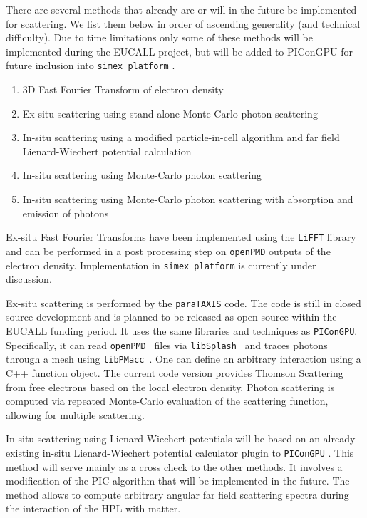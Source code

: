 \documentclass[10pt]{scrartcl}
\begin{document}
There are several methods that already are or will in the future be implemented for
scattering. We list them below in order of ascending generality (and technical
difficulty). Due to time limitations only some of these methods will be implemented
during the EUCALL project, but will be added to PIConGPU for future inclusion into
\texttt{simex\_platform} .

\begin{enumerate}
  \item 3D Fast Fourier Transform of electron density
    \label{pmi:methods:fft}
  \item Ex-situ scattering using stand-alone
    Monte-Carlo photon scattering \label{pmi:methods:exsituphoton}
  \item In-situ scattering using a modified particle-in-cell algorithm and far field
      Lienard-Wiechert potential calculation \label{pmi:methods:insitulienardwiechert}
    \item In-situ scattering using Monte-Carlo photon
    scattering\label{pmi:methods:insituphoton}
  \item In-situ scattering using Monte-Carlo photon scattering with absorption
    and emission of photons\label{pmi:methods:insituphotoninteract}
\end{enumerate}

Ex-situ Fast Fourier Transforms have been implemented using the \texttt{LiFFT}
library \cite{liblifft_github} and can be performed in a post processing step on
\texttt{openPMD} outputs of the electron density. Implementation in
\texttt{simex\_platform} is currently under discussion.

Ex-situ scattering is performed by the \texttt{paraTAXIS} code.
The code is still in closed source development and is planned to be released as open
source within the EUCALL funding period.
It uses the same libraries and
techniques as \texttt{PIConGPU}. Specifically, it can read
\texttt{openPMD}~\cite{openPMD} files via
\texttt{libSplash}~\cite{libSplash_github} and traces photons through a mesh
using \texttt{libPMacc}~\cite{picongpu_github}. One can define an arbitrary
interaction using a C++ function object. The current code version provides
Thomson Scattering from free electrons based on the local electron density.
Photon scattering is computed via repeated Monte-Carlo evaluation of the
scattering function, allowing for multiple scattering.

In-situ scattering using Lienard-Wiechert potentials will be based on an already
existing in-situ Lienard-Wiechert potential calculator plugin to
\texttt{PIConGPU} \cite{Pausch2013}. This method will serve mainly as a cross
check to the other methods. It involves a modification of the PIC algorithm that
will be implemented in the future. The method allows to compute arbitrary
angular far field scattering spectra during the interaction of the HPL with
matter.
\end{document}
